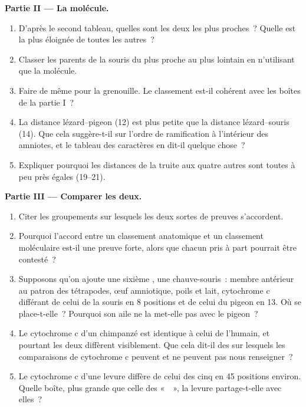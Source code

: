 \begin{problem}
\medskip
\noindent\textbf{Partie II --- La molécule.}
\begin{enumerate}[resume]
  \item D'après le second tableau, quelles sont les deux  les
        plus proches~? Quelle  est la plus éloignée de toutes les
        autres~?
  \item Classer les parents de la souris du plus proche au plus
        lointain en n'utilisant que la molécule.
  \item Faire de même pour la grenouille. Le classement est-il
        cohérent avec les boîtes de la partie I~?
  \item La distance lézard--pigeon (12) est plus petite que la
        distance lézard--souris (14). Que cela suggère-t-il sur l'ordre
        de ramification à l'intérieur des amniotes, et le tableau des
        caractères en dit-il quelque chose~?
  \item Expliquer pourquoi les distances de la truite aux quatre
        autres sont toutes à peu près égales (19--21).
\end{enumerate}

\medskip
\noindent\textbf{Partie III --- Comparer les deux.}
\begin{enumerate}[resume]
  \item Citer les groupements sur lesquels les deux sortes de preuves
        s'accordent.
  \item Pourquoi l'accord entre un classement anatomique et un
        classement moléculaire est-il une preuve forte, alors que
        chacun pris à part pourrait être contesté~?
  \item Supposons qu'on ajoute une sixième , une chauve-souris~:
        membre antérieur au patron des tétrapodes, œuf amniotique,
        poils et lait, cytochrome c différant de celui de la souris en
        8 positions et de celui du pigeon en 13. Où se place-t-elle~?
        Pourquoi son aile ne la met-elle pas avec le pigeon~?
  \item Le cytochrome c d'un chimpanzé est identique à celui de
        l'humain, et pourtant les deux  diffèrent visiblement.
        Que cela dit-il des  sur lesquels les comparaisons de
        cytochrome c peuvent et ne peuvent pas nous renseigner~?
  \item Le cytochrome c d'une levure diffère de celui des cinq 
        en 45 positions environ. Quelle boîte, plus grande que celle
        des «~~», la levure partage-t-elle avec elles~?
\end{enumerate}


\end{problem}
